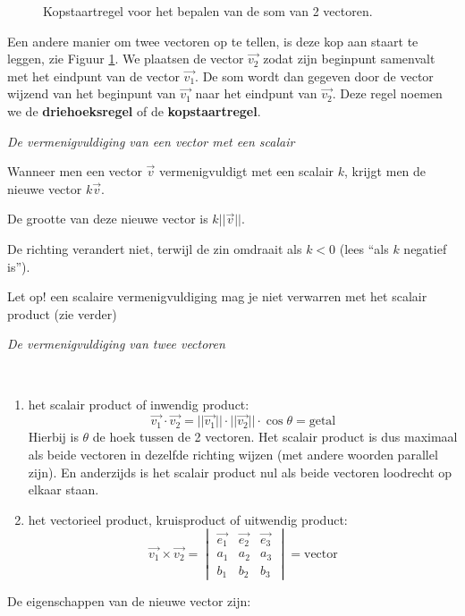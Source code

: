 \begin{figure}[H]
	\centering	
	
	\caption{Kopstaartregel voor het bepalen van de som van 2 vectoren.}
	\label{fig:kopstaartsom_par}
\end{figure}


Een andere manier om twee vectoren op te tellen, is deze kop aan staart te leggen, zie Figuur \ref{fig:kopstaartsom_par}. We plaatsen de vector $\vec{v_2}$ zodat zijn beginpunt samenvalt met het eindpunt van de vector $\vec{v_1}$. De som  wordt dan gegeven door de vector wijzend van het beginpunt van $\vec{v_1}$ naar het eindpunt van $\vec{v_2}$. Deze regel noemen we de \textbf{driehoeksregel} of de \textbf{kopstaartregel}.

\emph{De vermenigvuldiging van een vector met een scalair}

\begin{definitie}
	Wanneer men een vector $\vec{v}$ vermenigvuldigt met een scalair $k$, krijgt men de nieuwe vector $k\vec{v}$. 
	
	De grootte van deze nieuwe vector is $k||\vec{v}||$.
	
	De richting verandert niet, terwijl de zin omdraait als $k<0$ (lees “als $k$ negatief is”).
\end{definitie}

\begin{opmerking}
	Let op! een scalaire vermenigvuldiging mag je niet verwarren met het scalair product (zie verder)
\end{opmerking}

\emph{De vermenigvuldiging van twee vectoren}

\begin{definitie}
	\ \\
\begin{enumerate}
	\item het scalair product of inwendig product:
	\begin{equation*}
	\vec{v_1} \cdot \vec{v_2} = ||\vec{v_1}|| \cdot  ||\vec{v_2}|| \cdot \cos \theta = \text{getal}
	\end{equation*}
	Hierbij is $\theta$ de hoek tussen de 2 vectoren. Het scalair product is dus maximaal als beide vectoren in dezelfde richting wijzen (met andere woorden parallel zijn). En anderzijds is het scalair product nul als beide vectoren loodrecht op elkaar staan.

	\item het vectorieel product, kruisproduct of uitwendig product:
	\begin{equation*}
	\vec{v_1} \times \vec{v_2} = \begin{vmatrix}
	\vec{e_1} & \vec{e_2} & \vec{e_3} \\
	a_1 & a_2 & a_3 \\
	b_1 & b_2 & b_3 
	\end{vmatrix} = \text{vector}
	\end{equation*} 
\end{enumerate}
\end{definitie}
De eigenschappen van de nieuwe vector zijn:

